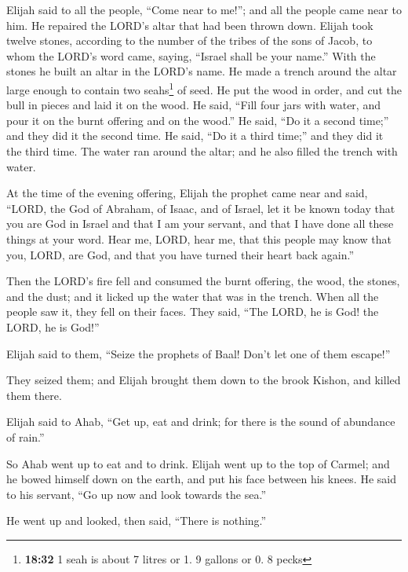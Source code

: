  Elijah said to all the people, ``Come near to me!''; and
all the people came near to him. He repaired the LORD's altar that had
been thrown down.  Elijah took twelve stones, according
to the number of the tribes of the sons of Jacob, to whom the LORD's
word came, saying, ``Israel shall be your name.''  With
the stones he built an altar in the LORD's name. He made a trench around
the altar large enough to contain two seahs\footnote{\textbf{18:32} 1
  seah is about 7 litres or 1. 9 gallons or 0. 8 pecks} of seed.
 He put the wood in order, and cut the bull in pieces and
laid it on the wood. He said, ``Fill four jars with water, and pour it
on the burnt offering and on the wood.''  He said, ``Do
it a second time;'' and they did it the second time. He said, ``Do it a
third time;'' and they did it the third time.  The water
ran around the altar; and he also filled the trench with water.

 At the time of the evening offering, Elijah the prophet
came near and said, ``LORD, the God of Abraham, of Isaac, and of Israel,
let it be known today that you are God in Israel and that I am your
servant, and that I have done all these things at your word.
 Hear me, LORD, hear me, that this people may know that
you, LORD, are God, and that you have turned their heart back again.''

 Then the LORD's fire fell and consumed the burnt
offering, the wood, the stones, and the dust; and it licked up the water
that was in the trench.  When all the people saw it, they
fell on their faces. They said, ``The LORD, he is God! the LORD, he is
God!''

 Elijah said to them, ``Seize the prophets of Baal! Don't
let one of them escape!''

They seized them; and Elijah brought them down to the brook Kishon, and
killed them there.

 Elijah said to Ahab, ``Get up, eat and drink; for there
is the sound of abundance of rain.''

 So Ahab went up to eat and to drink. Elijah went up to
the top of Carmel; and he bowed himself down on the earth, and put his
face between his knees.  He said to his servant, ``Go up
now and look towards the sea.''

He went up and looked, then said, ``There is nothing.''

